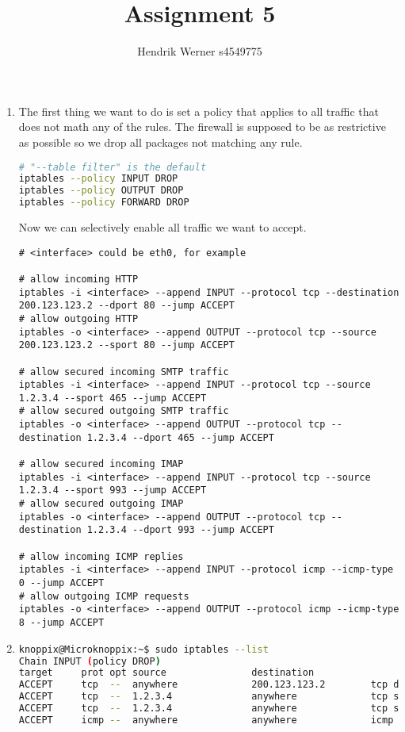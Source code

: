 \documentclass[12pt, a4paper]{article}
\title{Assignment 5}
\author{Hendrik Werner s4549775}
\begin{document}
\maketitle

\section{} %
\begin{enumerate}[a]
	\item %
	The first thing we want to do is set a policy that applies to all traffic that does not math any of the rules. The firewall is supposed to be as restrictive as possible so we drop all packages not matching any rule.

	\begin{lstlisting}[language=bash]
# "--table filter" is the default
iptables --policy INPUT DROP
iptables --policy OUTPUT DROP
iptables --policy FORWARD DROP
	\end{lstlisting}

	Now we can selectively enable all traffic we want to accept.

	\begin{lstlisting}
# <interface> could be eth0, for example

# allow incoming HTTP
iptables -i <interface> --append INPUT --protocol tcp --destination 200.123.123.2 --dport 80 --jump ACCEPT
# allow outgoing HTTP
iptables -o <interface> --append OUTPUT --protocol tcp --source 200.123.123.2 --sport 80 --jump ACCEPT

# allow secured incoming SMTP traffic
iptables -i <interface> --append INPUT --protocol tcp --source 1.2.3.4 --sport 465 --jump ACCEPT
# allow secured outgoing SMTP traffic
iptables -o <interface> --append OUTPUT --protocol tcp --destination 1.2.3.4 --dport 465 --jump ACCEPT

# allow secured incoming IMAP
iptables -i <interface> --append INPUT --protocol tcp --source 1.2.3.4 --sport 993 --jump ACCEPT
# allow secured outgoing IMAP
iptables -o <interface> --append OUTPUT --protocol tcp --destination 1.2.3.4 --dport 993 --jump ACCEPT

# allow incoming ICMP replies
iptables -i <interface> --append INPUT --protocol icmp --icmp-type 0 --jump ACCEPT
# allow outgoing ICMP requests
iptables -o <interface> --append OUTPUT --protocol icmp --icmp-type 8 --jump ACCEPT
	\end{lstlisting}
	\clearpage
	\item %
	\begin{lstlisting}[language=bash]
knoppix@Microknoppix:~$ sudo iptables --list
Chain INPUT (policy DROP)
target     prot opt source               destination
ACCEPT     tcp  --  anywhere             200.123.123.2        tcp dpt:http
ACCEPT     tcp  --  1.2.3.4              anywhere             tcp spt:ssmtp
ACCEPT     tcp  --  1.2.3.4              anywhere             tcp spt:imaps
ACCEPT     icmp --  anywhere             anywhere             icmp echo-reply


\end{lstlisting}
\end{enumerate}
\end{document}

